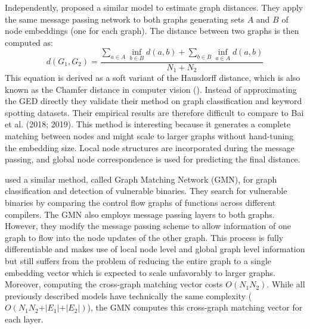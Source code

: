 Independently, \cite{riba2018} proposed a similar model to estimate graph distances. They apply the same message passing network to both graphs generating sets $A$ and $B$ of node embeddings (one for each graph). The distance between two graphs is then computed as:
\begin{equation}
     d(G_{1}, G_{2}) = \frac{\sum_{a \in A} \inf_{b \in B} d(a, b) + \sum_{b \in B} \inf_{a \in A} d(a, b)}{N_1 + N_2}
\end{equation}
This equation is derived as a soft variant of the Hausdorff distance, which is also known as the Chamfer distance in computer vision (\citealp{chamfer1977}). Instead of approximating the GED directly they validate their method on graph classification and keyword spotting datasets. Their empirical results are therefore difficult to compare to Bai et al. (2018; 2019). This method is interesting because it generates a complete matching between nodes and might scale to larger graphs without hand-tuning the embedding size. Local node structures are incorporated during the message passing, and global node correspondence is used for predicting the final distance.

\cite{li2019} used a similar method, called Graph Matching Network (GMN), for graph classification and detection of vulnerable binaries. They search for vulnerable binaries by comparing the control flow graphs of functions across different compilers. The GMN also employs message passing layers to both graphs. However, they modify the message passing scheme to allow information of one graph to flow into the node updates of the other graph. %
This process is fully differentiable and makes use of local node level and global graph level information but still suffers from the problem of reducing the entire graph to a single embedding vector which is expected to scale unfavorably to larger graphs. Moreover, computing the cross-graph matching vector costs $O(N_1 N_2)$. While all previously described models have technically the same complexity ($O(N_1 N_2 + \vert E_1 \vert + \vert E_2 \vert)$), the GMN computes this cross-graph matching vector for each layer.


